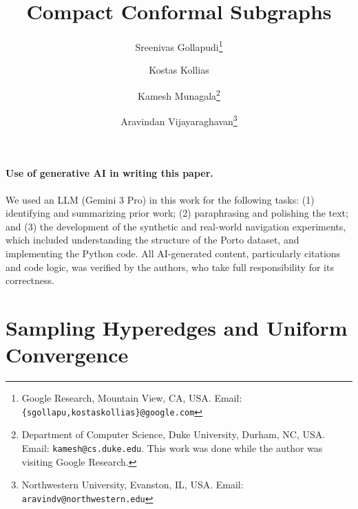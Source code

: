 \documentclass[11pt]{article}
\newcommand*\samethanks[1][\value{footnote}]{\footnotemark[#1]}
\begin{document}
\title{Compact Conformal Subgraphs}
\author{Sreenivas Gollapudi\thanks{Google Research, Mountain View, CA, USA. Email:{\tt \{sgollapu,kostaskollias\}@google.com}} \and Kostas Kollias\samethanks[1] \and Kamesh Munagala\thanks{Department of Computer Science, Duke University, Durham, NC, USA. Email: {\tt kamesh@cs.duke.edu}. This work was done while the author was visiting Google Research.} \and Aravindan Vijayaraghavan\thanks{Northwestern University, Evanston, IL, USA. Email: {\tt aravindv@northwestern.edu}}}
\date{}
\maketitle















\paragraph{Use of generative AI in writing this paper.}
We used an LLM (Gemini 3 Pro) in this work for the following tasks: (1) identifying  and summarizing prior work; (2) paraphrasing and polishing the text; and (3) the development of the synthetic and real-world navigation experiments, which included understanding the structure of the Porto dataset, and implementing the Python code. All AI-generated content, particularly citations and code logic, was verified by the authors, who take full responsibility for its correctness.





\appendix






\section{Sampling Hyperedges and Uniform Convergence}
\label{sec:sampling}





\end{document}
